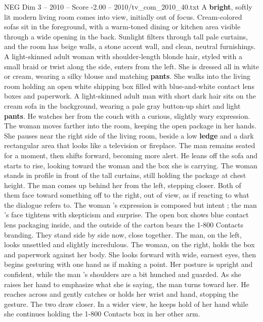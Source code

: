\begin{textsample}{NEG Dim 3 – 2010 – Score -2.00 – 2010/tv\_com\_2010\_40.txt}  \label{ex:f3_neg_017}
A \textbf{bright}, softly lit modern living room comes into view, initially out of focus.
Cream-colored sofas sit in the foreground, with a warm-toned dining or kitchen area visible through a wide opening in the back.
Sunlight filters through tall pale curtains, and the room has beige walls, a stone accent wall, and clean, neutral furnishings.
A light-skinned adult woman with shoulder-length blonde hair, styled with a small braid or twist along the side, enters from the left.
She is dressed all in white or cream, wearing a silky blouse and matching \textbf{pants}.
She walks into the living room holding an open white shipping box filled with blue-and-white contact lens boxes and paperwork.
A light-skinned adult man with short dark hair sits on the cream sofa in the background, wearing a pale gray button-up shirt and light \textbf{pants}.
He watches her from the couch with a curious, slightly wary expression.
The woman moves farther into the room, keeping the open package in her hands.
She pauses near the right side of the living room, beside a low \textbf{ledge} and a dark rectangular area that looks like a television or fireplace.
The man remains seated for a moment, then shifts forward, becoming more alert.
He leans off the sofa and starts to rise, looking toward the woman and the box she is carrying.
The woman stands in profile in front of the tall curtains, still holding the package at chest height.
The man comes up behind her from the left, stepping closer.
Both of them face toward something off to the right, out of view, as if reacting to what the dialogue refers to.
The woman ’s expression is composed but intent ; the man ’s face tightens with skepticism and surprise.
The open box shows blue contact lens packaging inside, and the outside of the carton bears the 1-800 Contacts branding.
They stand side by side now, close together.
The man, on the left, looks unsettled and slightly incredulous.
The woman, on the right, holds the box and paperwork against her body.
She looks forward with wide, earnest eyes, then begins gesturing with one hand as if making a point.
Her posture is upright and confident, while the man ’s shoulders are a bit hunched and guarded.
As she raises her hand to emphasize what she is saying, the man turns toward her.
He reaches across and gently catches or holds her wrist and hand, stopping the gesture.
The two draw closer.
In a wider view, he keeps hold of her hand while she continues holding the 1-800 Contacts box in her other arm.

\end{textsample}
